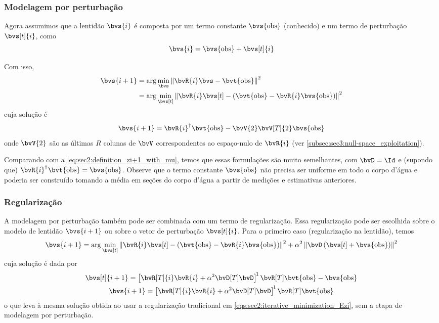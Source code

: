 \subsubsection{Modelagem por perturbação}

Agora assumimos que a lentidão $\bvs{i}$ é composta por um termo constante $\bvs{\obs}$ (conhecido) e um termo de perturbação $\bvs[t]{i}$, como
\begin{equation}
	\bvs{i} = \bvs{\obs} + \bvs[t]{i}
\end{equation}

Com isso,
\begin{equation}
	\begin{split}
		\bvs{i+1}
		& = \arg \min_{\bvs} \norm{\bvR{i} \bvs - \bvt{\obs}}^2 \\
		& = \arg \min_{\bvs[t]} \norm{\bvR{i} \bvs[t] - \pts{\bvt{\obs} - \bvR{i}\bvs{\obs}}}^2
	\end{split}
\end{equation}
cuja solução é
\begin{equation}
	\bvs{i+1} =  \pinv{\bvR{i}} \bvt{\obs} - \bvV{2}\bvV[T]{2} \bvs{\obs}
	\label{eq:sec4:bvz_perturbation_model}
\end{equation}
onde $\bvV{2}$ são as últimas $R$ colunas de $\bvV$ correspondentes ao espaço-nulo de $\bvR{i}$ (ver \cref{subsec:sec3:null-space_exploitation}).

Comparando com a \cref{eq:sec2:definition_zi+1_with_mu}, temos que essas formulações são muito semelhantes, com $\bvD = \Id$ e (supondo que) $\pinv{\bvR{i}} \bvt{\obs} = \bvs{\obs}$. Observe que o termo constante $\bvs{\obs}$ não precisa ser uniforme em todo o corpo d’água e poderia ser construído tomando a média em seções do corpo d’água a partir de medições e estimativas anteriores.

\subsubsection{Regularização}

A modelagem por perturbação também pode ser combinada com um termo de regularização. Essa regularização pode ser escolhida sobre o modelo de lentidão $\bvs{i+1}$ ou sobre o vetor de perturbação $\bvs[t]{i}$. Para o primeiro caso (regularização na lentidão), temos
\begin{equation}
	\bvs{i+1} = \arg\min_{\bvs[t]} \norm{\bvR{i} \bvs[t] - \pts{\bvt{\obs} - \bvR{i} \bvs{\obs}}}^2 + \alpha^2\norm{\bvD \pts{\bvs[t] + \bvs{\obs}}}^2 
\end{equation}
cuja solução é dada por
\begin{subequations}
	\begin{gather}
		\bvs[t]{i+1} = \inv*{\bvR[T]{i} \bvR{i} + \alpha^2 \bvD[T] \bvD} \bvR[T] \bvt{\obs} - \bvs{\obs} \\
		\bvs{i+1} = \inv*{\bvR[T]{i} \bvR{i} + \alpha^2 \bvD[T] \bvD} \bvR[T] \bvt{\obs}
	\end{gather}
\end{subequations}
o que leva à mesma solução obtida ao usar a regularização tradicional em \cref{eqs:sec2:iterative_minimization_Ezi}, sem a etapa de modelagem por perturbação.

